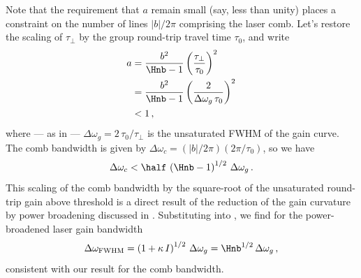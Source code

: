 Note that the requirement that $a$ remain small (say, less than unity) places a constraint on the number of lines $|b| / 2 \pi$ comprising the laser comb. Let's restore the scaling of $\tau_\perp$ by the group round-trip travel time $\tau_0$, and write
\begin{equation}
    \begin{split}
        a &= \frac{b^2}{\Hnb - 1} \left(\frac{\tau_\perp}{\tau_0}\right)^2 \\
        &= \frac{b^2}{\Hnb - 1} \left(\frac{2}{\Delta \omega_g\, \tau_0}\right)^2 \\
        & < 1\, ,
    \end{split}
\end{equation}
where --- as in  --- $\Delta \omega_g = 2\, \tau_0 / \tau_\perp$ is the unsaturated FWHM of the gain curve. The comb bandwidth is given by $\Delta \omega_c = (|b| / 2 \pi) (2 \pi / \tau_0)$, so we have
\begin{equation}
    \Delta \omega_c < \half\, \left(\Hnb - 1\right)^{1/2}\, \Delta \omega_g\, .
\end{equation}
This scaling of the comb bandwidth by the square-root of the unsaturated round-trip gain above threshold is a direct result of the reduction of the gain curvature by power broadening discussed in . Substituting  into , we find for the power-broadened laser gain bandwidth
\begin{equation}
    \Delta \omega_\mathrm{FWHM} = \left(1 + \kappa\, I\right)^{1/2}\, \Delta \omega_g = \Hnb^{1/2}\, \Delta \omega_g\, ,
\end{equation}
consistent with our result for the comb bandwidth.

